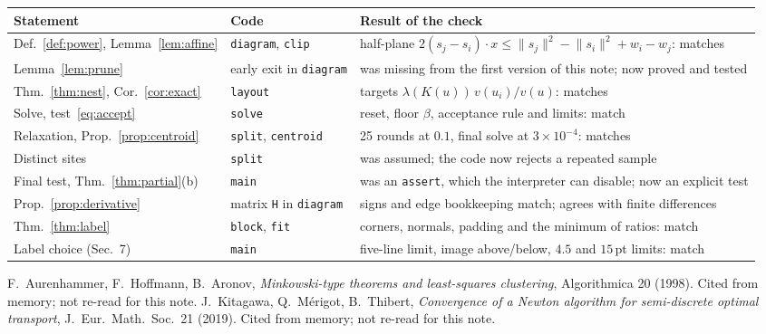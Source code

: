 \documentclass[11pt,a4paper]{article}
\theoremstyle{plain}
\theoremstyle{definition}
\theoremstyle{remark}
\newcommand{\area}{\lambda}
\newcommand{\norm}[1]{\lVert #1\rVert}
\begin{document}
\begin{center}
\small
\begin{tabular}{@{}p{4.3cm}p{3.4cm}p{6.6cm}@{}}
\toprule
Statement & Code & Result of the check \\
\midrule
Def.~\ref{def:power}, Lemma~\ref{lem:affine} & \texttt{diagram}, \texttt{clip} & half-plane $2(s_j-s_i)\cdot x\le\norm{s_j}^2-\norm{s_i}^2+w_i-w_j$: matches \\
Lemma~\ref{lem:prune} & early exit in \texttt{diagram} & was missing from the first version of this note; now proved and tested \\
Thm.~\ref{thm:nest}, Cor.~\ref{cor:exact} & \texttt{layout} & targets $\area(K(u))\,v(u_i)/v(u)$: matches \\
Solve, test~\eqref{eq:accept} & \texttt{solve} & reset, floor $\beta$, acceptance rule and limits: match \\
Relaxation, Prop.~\ref{prop:centroid} & \texttt{split}, \texttt{centroid} & 25 rounds at $0.1$, final solve at $3\times10^{-4}$: matches \\
Distinct sites & \texttt{split} & was assumed; the code now rejects a repeated sample \\
Final test, Thm.~\ref{thm:partial}(b) & \texttt{main} & was an \texttt{assert}, which the interpreter can disable; now an explicit test \\
Prop.~\ref{prop:derivative} & matrix \texttt{H} in \texttt{diagram} & signs and edge bookkeeping match; agrees with finite differences \\
Thm.~\ref{thm:label} & \texttt{block}, \texttt{fit} & corners, normals, padding and the minimum of ratios: match \\
Label choice (Sec.~7) & \texttt{main} & five-line limit, image above/below, $4.5$ and $15$\,pt limits: match \\
\bottomrule
\end{tabular}
\end{center}

\begin{thebibliography}{9}
 F.~Aurenhammer, F.~Hoffmann, B.~Aronov,
  \emph{Minkowski-type theorems and least-squares clustering},
  Algorithmica 20 (1998). Cited from memory; not re-read for this note.
 J.~Kitagawa, Q.~M\'erigot, B.~Thibert,
  \emph{Convergence of a Newton algorithm for semi-discrete optimal transport},
  J.\ Eur.\ Math.\ Soc.\ 21 (2019). Cited from memory; not re-read for this
  note.
\end{thebibliography}
\end{document}
